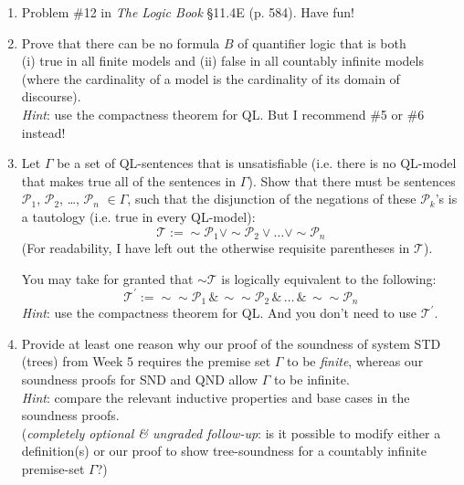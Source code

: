 \documentclass[12pt]{article}
\def\eor{\ensuremath{\vee}}
\def\eand{\ensuremath{\,\&\,}}
\def\enot{\ensuremath{{\sim}}} %
\let\oldsim\sim %
\renewcommand{\sim}{{\oldsim}} %
\newcommand*{\script}[1]{\ensuremath{\mathcal{#1}}}
\newcommand*{\metav}[1]{\ensuremath{\mathcal{#1}}}
\begin{document}
\begin{enumerate}


\item Problem \#12 in \textit{The Logic Book} \S 11.4E (p. 584). Have fun! 

\item Prove that there can be no formula $B$ of quantifier logic that is both \\ (i) true in all finite models and (ii) false in all countably infinite models \\ (where the cardinality of a model is the cardinality of its domain of discourse). \\ \textit{Hint}: use the compactness theorem for QL. But I recommend \#5 or \#6 instead! 

\item Let $\Gamma$ be a set of QL-sentences that is unsatisfiable (i.e. there is no QL-model that makes true all of the sentences in $\Gamma $). Show that there must be sentences $\metav{P}_1$, $\metav{P}_2$, \dots, $\metav{P}_n$ $\in \Gamma$, such that the disjunction of the negations of these $\metav{P}_k$'s is a tautology (i.e. true in every QL-model): 
\[ \metav{T} :=\enot \metav{P}_1 \eor \enot \metav{P}_2 \eor \dots \eor \enot \metav{P}_n \]
(For readability, I have left out the otherwise requisite parentheses in $\metav{T}$). 

You may take for granted that $\enot \metav{T}$ is logically equivalent to the following:
\[ \metav{T}^{\prime} := \enot \enot\metav{P}_1 \eand \enot \enot\metav{P}_2 \eand \dots \eand \enot \enot\metav{P}_n \]
\textit{Hint}: use the compactness theorem for QL. And you don't need to use $\metav{T}^{\prime}$. 

\item Provide at least one reason why our proof of the soundness of system STD (trees) from Week 5 requires the premise set $\Gamma$ to be \textit{finite}, whereas our soundness proofs for SND and QND allow $\Gamma$ to be infinite. \\
\textit{Hint}: compare the relevant inductive properties and base cases in the soundness proofs. 
\\ (\textit{completely optional \& ungraded follow-up}: is it possible to modify either a definition(s) or our proof to show tree-soundness for a countably infinite premise-set $\Gamma$?) 


\end{enumerate}
\end{document}

